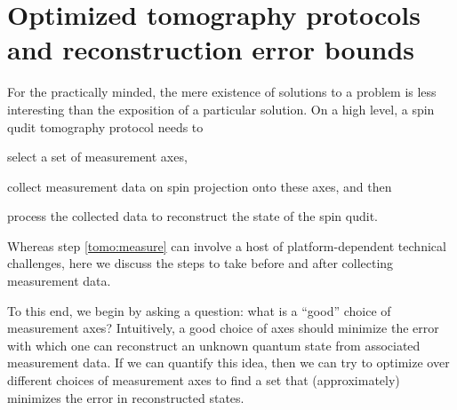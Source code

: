 \documentclass[notitlepage,twocolumn]{revtex4-2}
\newcommand{\1}{\mathds{1}}
\begin{document}
\section{Optimized tomography protocols and reconstruction error bounds}
\label{sec:protocol}

For the practically minded, the mere existence of solutions to a problem is less interesting than the exposition of a particular solution.
On a high level, a spin qudit tomography protocol needs to
\begin{enumerate*}
\item select a set of measurement axes,
\item collect measurement data on spin projection onto these axes, and then
  \label{tomo:measure}
\item process the collected data to reconstruct the state of the spin qudit.
\end{enumerate*}
Whereas step \ref{tomo:measure} can involve a host of platform-dependent technical challenges, here we discuss the steps to take before and after collecting measurement data.

To this end, we begin by asking a question: what is a ``good'' choice of measurement axes?
Intuitively, a good choice of axes should minimize the error with which one can reconstruct an unknown quantum state from associated measurement data.
If we can quantify this idea, then we can try to optimize over different choices of measurement axes to find a set that (approximately) minimizes the error in reconstructed states.
\end{document}
